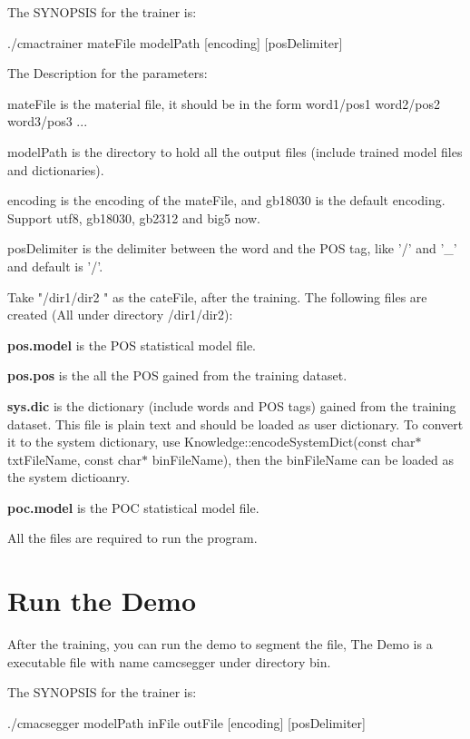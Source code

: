 The SYNOPSIS for the trainer is: \par
 ./cmactrainer mateFile modelPath [encoding] [posDelimiter] \par


\par
The Description for the parameters: 
\begin{DoxyItemize}
\item mateFile is the material file, it should be in the form word1/pos1 word2/pos2 word3/pos3 ... 
\item modelPath is the directory to hold all the output files (include trained model files and dictionaries). 
\item encoding is the encoding of the mateFile, and gb18030 is the default encoding. Support utf8, gb18030, gb2312 and big5 now. 
\item posDelimiter is the delimiter between the word and the POS tag, like '/' and '\_\-' and default is '/'. 
\end{DoxyItemize}

Take "/dir1/dir2 " as the cateFile, after the training. The following files are created (All under directory /dir1/dir2): 
\begin{DoxyEnumerate}
\item {\bfseries pos.model} is the POS statistical model file. 
\item {\bfseries pos.pos} is the all the POS gained from the training dataset. 
\item {\bfseries sys.dic} is the dictionary (include words and POS tags) gained from the training dataset. This file is plain text and should be loaded as user dictionary. To convert it to the system dictionary, use Knowledge::encodeSystemDict(const char$\ast$ txtFileName, const char$\ast$ binFileName), then the binFileName can be loaded as the system dictioanry. 
\item {\bfseries poc.model} is the POC statistical model file. 
\end{DoxyEnumerate}

All the files are required to run the program.\par
\section{Run the Demo}\label{index_rundemo}
After the training, you can run the demo to segment the file, The Demo is a executable file with name camcsegger under directory bin.

The SYNOPSIS for the trainer is: \par
 ./cmacsegger modelPath inFile outFile [encoding] [posDelimiter] \par


